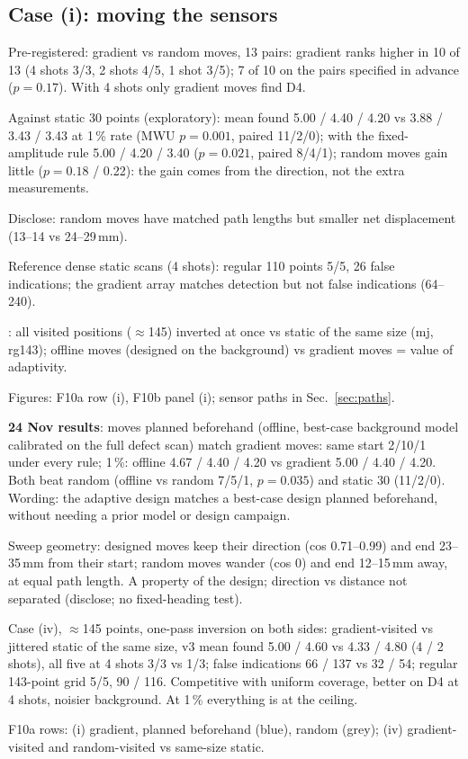 \subsection{Case (i): moving the sensors}\label{sec:case-i}
\begin{notes}
\item Pre-registered: gradient vs random moves, 13 pairs: gradient ranks higher in 10 of 13 (4 shots 3/3, 2 shots 4/5, 1 shot 3/5); 7 of 10 on the pairs specified in advance ($p=0.17$). With 4 shots only gradient moves find D4.
\item Against static 30 points (exploratory): mean found 5.00 / 4.40 / 4.20 vs 3.88 / 3.43 / 3.43 at 1\,\% rate (MWU $p=0.001$, paired 11/2/0); with the fixed-amplitude rule 5.00 / 4.20 / 3.40 ($p=0.021$, paired 8/4/1); random moves gain little ($p=0.18$ / 0.22): the gain comes from the direction, not the extra measurements.
\item Disclose: random moves have matched path lengths but smaller net displacement (13--14 vs 24--29\,mm).
\item Reference dense static scans (4 shots): regular 110 points 5/5, 26 false indications; the gradient array matches detection but not false indications (64--240).
\item {}: all visited positions ($\approx$145) inverted at once vs static of the same size (mj, rg143); offline moves (designed on the background) vs gradient moves = value of adaptivity.
\item Figures: F10a row (i), F10b panel (i); sensor paths in Sec.~\ref{sec:paths}.
\item \textbf{24 Nov results}: moves planned beforehand (offline, best-case background model calibrated on the full defect scan) match gradient moves: same start 2/10/1 under every rule; 1\,\%: offline 4.67 / 4.40 / 4.20 vs gradient 5.00 / 4.40 / 4.20. Both beat random (offline vs random 7/5/1, $p=0.035$) and static 30 (11/2/0). Wording: the adaptive design matches a best-case design planned beforehand, without needing a prior model or design campaign.
\item Sweep geometry: designed moves keep their direction (cos 0.71--0.99) and end 23--35\,mm from their start; random moves wander (cos 0) and end 12--15\,mm away, at equal path length. A property of the design; direction vs distance not separated (disclose; no fixed-heading test).
\item Case (iv), $\approx$145 points, one-pass inversion on both sides: gradient-visited vs jittered static of the same size, v3 mean found 5.00 / 4.60 vs 4.33 / 4.80 (4 / 2 shots), all five at 4 shots 3/3 vs 1/3; false indications 66 / 137 vs 32 / 54; regular 143-point grid 5/5, 90 / 116. Competitive with uniform coverage, better on D4 at 4 shots, noisier background. At 1\,\% everything is at the ceiling.
\item F10a rows: (i) gradient, planned beforehand (blue), random (grey); (iv) gradient-visited and random-visited vs same-size static.
\end{notes}
